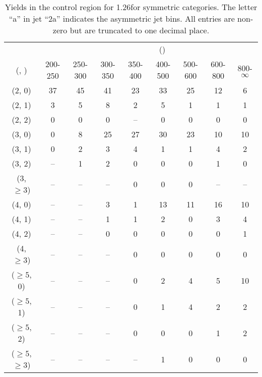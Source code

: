 \begin{table}[h!]
\tiny
\centering
\caption{Yields in the \mmj control region for 1.26\ifb for symmetric categories. The letter ``a'' in jet \eg ``2a''  indicates the asymmetric jet bins. All entries are non-zero but are truncated to one decimal place.\label{tab:yieldssep_data_mumu_sym}}
\begin{tabular}
{ccccccccc}
	\hline\hline
&	& \multicolumn{8}{c}{\scalht (\gev)} \\ 
	 (\njet,  \nb) & 200-250 & 250-300 & 300-350 & 350-400 & 400-500 & 500-600 & 600-800 & 800-$\infty$ \\ [0.8ex] 
\hline
	(2, 0) & 37 & 45 & 41 & 23 & 33 & 25 & 12 & 6 \\[0.5ex] 
	(2, 1) & 3 & 5 & 8 & 2 & 5 & 1 & 1 & 1 \\[0.5ex] 
	(2, 2) & 0 & 0 & 0 & -- & 0 & 0 & 0 & 0 \\[0.5ex] 
	(3, 0) & 0 & 8 & 25 & 27 & 30 & 23 & 10 & 10 \\[0.5ex] 
	(3, 1) & 0 & 2 & 3 & 4 & 1 & 1 & 4 & 2 \\[0.5ex] 
	(3, 2) & -- & 1 & 2 & 0 & 0 & 0 & 1 & 0 \\[0.5ex] 
	(3, $\ge3$) & -- & -- & -- & 0 & 0 & 0 & -- & -- \\[0.5ex] 
	(4, 0) & -- & -- & 3 & 1 & 13 & 11 & 16 & 10 \\[0.5ex] 
	(4, 1) & -- & -- & 1 & 1 & 2 & 0 & 3 & 4 \\[0.5ex] 
	(4, 2) & -- & -- & 0 & 0 & 0 & 0 & 0 & 1 \\[0.5ex] 
	(4, $\ge3$) & -- & -- & -- & 0 & 0 & 0 & 0 & 0 \\[0.5ex] 
	($\ge5$, 0) & -- & -- & -- & 0 & 2 & 4 & 5 & 10 \\[0.5ex] 
	($\ge5$, 1) & -- & -- & -- & 0 & 1 & 4 & 2 & 2 \\[0.5ex] 
	($\ge5$, 2) & -- & -- & -- & 0 & 0 & 0 & 1 & 2 \\[0.5ex] 
	($\ge5$, $\ge3$) & -- & -- & -- & -- & 1 & 0 & 0 & 0 \\[0.5ex] 
	\hline
	\hline
\end{tabular}
\end{table}
